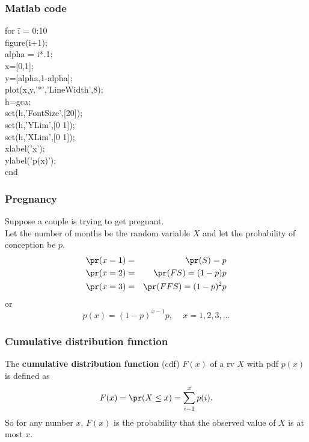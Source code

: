 \begin{frame}[fragile]\frametitle{Matlab code}

\begin{tabbing}
for \= i = 0:10\\
\> figure(i+1);\\  
\>  alpha = i*.1;\\
\>  x=[0,1];\\
\>  y=[alpha,1-alpha];\\
\>  plot(x,y,'*','LineWidth',8);\\ 
\>  h=gca;\\
\>  set(h,'FontSize',[20]);\\
\>  set(h,'YLim',[0 1]);\\
\>  set(h,'XLim',[0 1]);\\
\>  xlabel('x');  \\
\>  ylabel('p(x)'); \\
end
\end{tabbing}

\end{frame}



\begin{frame}[fragile]\frametitle{Pregnancy}

Suppose a couple is trying to get pregnant. \\ 

Let the number of months be the random variable $X$ and let
the probability of conception be $p$. 
\begin{eqnarray*}
\pr(x=1) &=& \pr(S) = p \\ 
\pr(x=2) &=& \pr(FS) = (1-p)p  \\ 
\pr(x=3) &=& \pr(FFS) = (1-p)^{2}p  
\end{eqnarray*}
or
$$p(x) = (1-p)^{x-1}p, \, \, \, \, \, \, \, x=1,2,3,...$$


\end{frame}


\begin{frame}[fragile]\frametitle{Cumulative distribution function}

\begin{defn}
The {\bf cumulative distribution function} (cdf) $F(x)$ of
a rv $X$ with pdf $p(x)$ is defined as
$$F(x) = \pr(X \leq x) = \sum_{i=1}^x p(i).$$
So for any number $x$, $F(x)$ is the probability that the
observed value of $X$ is at most $x$.
\end{defn}

\end{frame}



